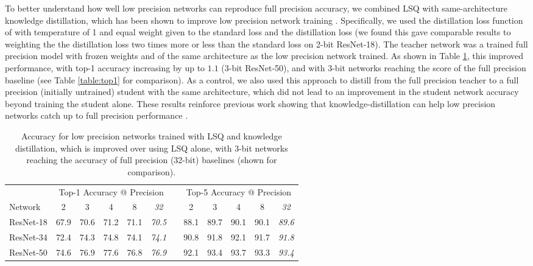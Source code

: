 \documentclass{article}
\begin{document}
To better understand how well low precision networks can reproduce full precision accuracy, we combined LSQ with same-architecture knowledge distillation, which has been shown to improve low precision network training \citep{mishra2017apprentice}.
Specifically, we used the distillation loss function of \citet{hinton2015distilling} with temperature of 1 and equal weight given to the standard loss and the distillation loss (we found this gave comparable results to weighting the the distillation loss two times more or less than the standard loss on 2-bit ResNet-18).  The teacher network was a trained full precision model with frozen weights and of the same architecture as the low precision network trained.
As shown in Table \ref{table:kd}, this improved performance, with top-1 accuracy increasing by up to $1.1$ (3-bit ResNet-50), and with 3-bit networks reaching the score of the full precision baseline (see Table \ref{table:top1} for comparison).
As a control, we also used this approach to distill from the full precision teacher to a full precision (initially untrained) student with the same architecture, which did not lead to an improvement in the student network accuracy beyond training the student alone.
These results reinforce previous work showing that knowledge-distillation can help low precision networks catch up to full precision performance \citep{mishra2017apprentice}.


\begin{table}[h]
	\caption{Accuracy for low precision networks trained with LSQ and knowledge distillation, which is improved over using LSQ alone, with 3-bit networks reaching the accuracy of full precision (32-bit) baselines (shown for comparison).}
	\label{table:kd}
	\setlength\tabcolsep{6pt}
\begin{center}
\small
\begin{tabular}{l ccccc c ccccc}
		\toprule
		& \multicolumn{5}{c}{Top-1 Accuracy @ Precision} & & \multicolumn{5}{c}{Top-5 Accuracy @ Precision} \\
Network  & 2 & 3 & 4 & 8 & \textit{32} & & 2 & 3 & 4 & 8 & \textit{32}\\
		\midrule
		ResNet-18 	& 67.9	& 70.6	& 71.2	& 71.1	& \textit{70.5}	& 	& 88.1	& 89.7	& 90.1	& 90.1	& \textit{89.6} \\
		ResNet-34 	& 72.4	& 74.3	& 74.8	& 74.1	& \textit{74.1}	&	& 90.8	& 91.8	& 92.1	& 91.7 	& \textit{91.8} \\		
		ResNet-50 	& 74.6	& 76.9	& 77.6	& 76.8	& \textit{76.9}	& 	& 92.1	& 93.4	& 93.7	& 93.3 	& \textit{93.4} \\				
		\bottomrule
	\end{tabular}
\end{center}
\end{table}
\end{document}
